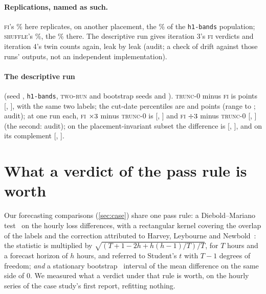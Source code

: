 \documentclass[11pt]{article}
\newcommand{\code}[1]{\texttt{#1}}
\newcommand{\FI}{\textsc{fi}}
\newcommand{\TZ}{\textsc{trunc-0}}
\newcommand{\TR}{\textsc{two-run}}
\newcommand{\SH}{\textsc{shuffle}}
\newcommand{\pct}{\%}
\begin{document}
\paragraph{Replications, named as such.} \FI's \NumCFiAll\pct{} here replicates, on another
placement, the \NumDFiAll\pct{} of the \code{h1-bands} population; \SH's \NumCShAll\pct, the
\NumDShAll\pct{} there. The descriptive run gives iteration 3's \FI{} verdicts and iteration 4's twin
counts again, leak by leak (audit; a check of drift against those runs' outputs, not an independent implementation).

\paragraph{The descriptive run} (seed \NumDescSeed, \code{h1-bands}, \TR{} and bootstrap seeds
\NumDescTwoRunSeed{} and \NumDescBootSeed). \TZ{} minus \FI{} is \NumDHDiff{} points [\NumDHLo,
\NumDHHi], with the same two labels; the cut-date percentiles are \NumDBootLo{} and \NumDBootHi{}
points (range \NumDBootMin{} to \NumDBootMax; audit); at one run each, \FI{} $\times3$ minus
\TZ{} is \NumDEqFiUpTzDiff{} [\NumDEqFiUpTzLo, \NumDEqFiUpTzHi] and \FI{} $\div3$ minus
\TZ{} \NumDDownDiff{} [\NumDDownLo, \NumDDownHi] (the second: audit); on the placement-invariant subset the difference is
\NumDInvDiff{} [\NumDInvLo, \NumDInvHi], and on its complement \NumDCompDiff{} [\NumDCompLo,
\NumDCompHi].

\section{What a verdict of the pass rule is worth}\label{sec:power}

Our forecasting comparisons (\cref{sec:case}) share one pass rule: a Diebold--Mariano
test~\cite{diebold1995} %
on the hourly loss differences, with a rectangular kernel covering the overlap of the labels and
the correction attributed to Harvey, Leybourne and Newbold~\cite{harvey1997}: %
the statistic is multiplied by $\sqrt{(T+1-2h+h(h-1)/T)/T}$, for $T$ hours and a forecast horizon
of $h$ hours, and referred to Student's $t$ with $T-1$ degrees of freedom; \emph{and} a stationary
bootstrap~\cite{politis1994} %
interval of the mean difference on the same side of 0. We measured what a verdict under that rule is worth, on the
hourly series of the case study's first report, refitting nothing.
\end{document}
